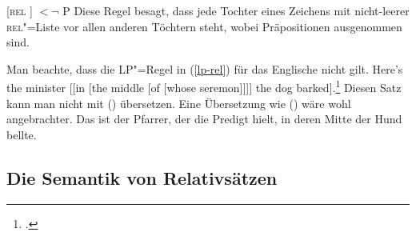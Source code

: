 \ea
\label{lp-rel}
{}[\textsc{rel} \sliste{ [] }] $< \neg$ P
\z
Diese Regel besagt, dass jede Tochter eines Zeichens mit nicht-leerer 
\textsc{rel}"=Liste vor allen anderen Töchtern steht, wobei Präpositionen ausgenommen sind. 

Man beachte, dass die LP"=Regel in (\ref{lp-rel}) für das
Englische nicht gilt.
\ea
Here's the minister [[in [the middle [of [whose seremon]]]] 
the dog barked].\footnote{ 
	.
}
\z
Diesen Satz kann man nicht mit () übersetzen.
\z
Eine Übersetzung wie () wäre wohl angebrachter.
\ea
Das ist der Pfarrer, der die Predigt hielt, in deren Mitte der Hund bellte.
\z
{}


\subsection{Die Semantik von Relativsätzen}
\label{Abschnitt-rs-sem-Analyse}

